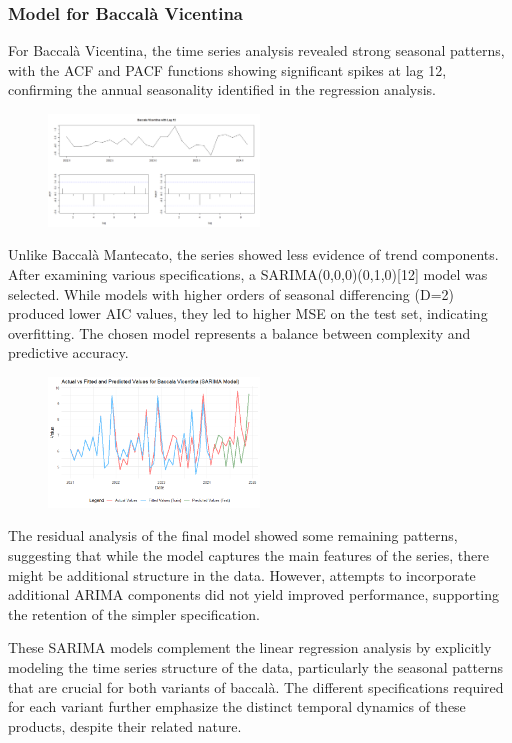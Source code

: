 \documentclass[10pt,twocolumn,letterpaper]{article}
\begin{document}
\subsubsection{Model for Baccalà Vicentina}
For Baccalà Vicentina, the time series analysis revealed strong seasonal patterns, with the ACF and PACF functions showing significant spikes at lag 12, confirming the annual seasonality identified in the regression analysis. 
\begin{figure}[H]
    \centering
    \includegraphics[width=0.5\textwidth]{PlotsBEFD/ACF_VIC_LAG12.png} 
    \caption{}
    \label{fig:esempio}
\end{figure}
Unlike Baccalà Mantecato, the series showed less evidence of trend components.
After examining various specifications, a SARIMA(0,0,0)(0,1,0)[12] model was selected.
While models with higher orders of seasonal differencing (D=2) produced lower AIC values, they led to higher MSE on the test set, indicating overfitting. The chosen model represents a balance between complexity and predictive accuracy.
\begin{figure}[H]
    \centering
    \includegraphics[width=0.5\textwidth]{PlotsBEFD/PRED_SARIMA_VIC.png} 
    \caption{}
    \label{fig:esempio}
\end{figure}
The residual analysis of the final model showed some remaining patterns, suggesting that while the model captures the main features of the series, there might be additional structure in the data. However, attempts to incorporate additional ARIMA components did not yield improved performance, supporting the retention of the simpler specification.



These SARIMA models complement the linear regression analysis by explicitly modeling the time series structure of the data, particularly the seasonal patterns that are crucial for both variants of baccalà. The different specifications required for each variant further emphasize the distinct temporal dynamics of these products, despite their related nature.
\end{document}
